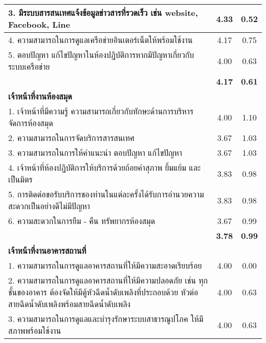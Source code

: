 \begin{longtable}{|>{\raggedright}p{11cm}|c|c|}
		3. มีระบบสารสนเทศแจ้งข้อมูลข่าวสารที่รวดเร็ว เช่น website, Facebook, Line    & 4.33     & 0.52          \\ \hline
		4. ความสามารถในการดูแลเครือข่ายอินเตอร์เน็ตให้พร้อมใช้งาน                 & 4.17            & 0.75          \\ \hline
		5. ตอบปัญหา แก้ไขปัญหาในห้องปฏิบัติการหากมีปัญหาเกี่ยวกับระบบเครือข่าย       	& 4.00           & 0.63          \\ \hline
		\multicolumn{1}{|r|}{\textbf{เฉลี่ยเจ้าหน้าที่เทคโนโลยีสารสนเทศ}}  & \textbf{4.17}  & \textbf{0.61} \\ \hline
		\textbf{เจ้าหน้าที่งานห้องสมุด}         					&                  &               \\ \hline
		1. เจ้าหน้าที่มีความรู้ ความสามารถเกี่ยวกับทักษะด้านการบริหารจัดการห้องสมุด    		& 4.00           & 1.10          \\ \hline
		2. ความสามารถในการจัดบริการสารสนเทศ  						& 3.67             & 1.03          \\ \hline
		3. ความสามารถในการให้คำแนะนำ ตอบปัญหา แก้ไขปัญหา				& 3.67             & 1.03          \\ \hline
		4. เจ้าหน้าที่ห้องปฏิบัติการให้บริการด้วยถ้อยคำสุภาพ ยิ้มแย้ม และเป็นมิตร  			& 3.83          & 0.98          \\ \hline
		5. การติดต่อขอรับบริการชองท่านในแต่ละครั้งได้รับการอำนวยความสะดวกเป็นอย่างดีไม่มีปัญหา & 3.83           & 0.98          \\ \hline
			6. ความสะดวกในการยืม - คืน ทรัพยากรห้องสมุด & 3.67                              & 0.99          \\ \hline
		\multicolumn{1}{|r|}{\textbf{เฉลี่ยเจ้าหน้าที่ห้องสมุด}} & \textbf{3.78}     & \textbf{0.99} \\ \hline
	\textbf{เจ้าหน้าที่งานอาคารสถานที่}         &                                   &               \\ \hline
1. ความสามารถในการดูแลอาคารสถานที่ให้มีความสะอาดเรียบร้อย                            
& 4.00                              & 0.00          \\ \hline
	2. ความสามารถในการดูแลอาคารสถานที่ให้มีความปลอดภัย เช่น ทุกชั้นของอาคาร
	ต้องจัดให้มีตู้หัวฉีดน้ำดับเพลิงที่ประกอบด้วย หัวต่อสายฉีดน้ำดับเพลิงพร้อมสายฉีดน้ำดับเพลิง   & 4.00                              & 0.63          \\ \hline
3. ความสามารถในการดูแลและบำรุงรักษาระบบสาธารณูปโภค ให้มีสภาพพร้อมใช้งาน
& 4.00                              & 0.63          \\ \hline

\end{longtable}
